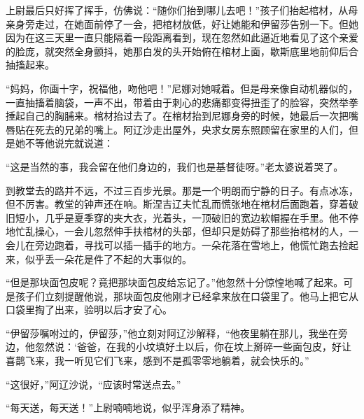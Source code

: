 \par 上尉最后只好挥了挥手，仿佛说：“随你们抬到哪儿去吧！”孩子们抬起棺材，从母亲身旁走过，在她面前停了一会，把棺材放低，好让她能和伊留莎告别一下。但她因为在这三天里一直只能隔着一段距离看到，现在忽然如此逼近地看见了这个亲爱的脸庞，就突然全身颤抖，她那白发的头开始俯在棺材上面，歇斯底里地前仰后合抽搐起来。
\par “妈妈，你画十字，祝福他，吻他吧！”尼娜对她喊着。但是母亲像自动机器似的，一直抽搐着脑袋，一声不出，带着由于刺心的悲痛都变得扭歪了的脸容，突然举拳捶起自己的胸脯来。棺材抬过去了。在棺材抬到尼娜身旁的时候，她最后一次把嘴唇贴在死去的兄弟的嘴上。阿辽沙走出屋外，央求女房东照顾留在家里的人们，但是她不等他说完就说道：
\par “这是当然的事，我会留在他们身边的，我们也是基督徒呀。”老太婆说着哭了。
\par 到教堂去的路并不远，不过三百步光景。那是一个明朗而宁静的日子。有点冰冻，但不厉害。教堂的钟声还在响。斯涅吉辽夫忙乱而慌张地在棺材后面跑着，穿着破旧短小，几乎是夏季穿的夹大衣，光着头，一顶破旧的宽边软帽握在手里。他不停地忙乱操心，一会儿忽然伸手扶棺材的头部，但却只是妨碍了那些抬棺材的人，一会儿在旁边跑着，寻找可以插一插手的地方。一朵花落在雪地上，他慌忙跑去捡起来，似乎丢一朵花是件了不起的大事似的。
\par “但是那块面包皮呢？竟把那块面包皮给忘记了。”他忽然十分惊惶地喊了起来。可是孩子们立刻提醒他说，那块面包皮他刚才已经拿来放在口袋里了。他马上把它从口袋里掏了出来，验明以后才安了心。
\par “伊留莎嘱咐过的，伊留莎，”他立刻对阿辽沙解释，“他夜里躺在那儿，我坐在旁边，他忽然说：‘爸爸，在我的小坟填好土以后，你在坟上掰碎一些面包皮，好让喜鹊飞来，我一听见它们飞来，感到不是孤零零地躺着，就会快乐的。”
\par “这很好，”阿辽沙说，“应该时常送点去。”
\par “每天送，每天送！”上尉喃喃地说，似乎浑身添了精神。
